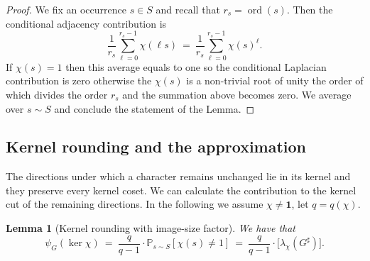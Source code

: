 \documentclass[11pt]{article}
\newtheorem{lemma}[theorem]{Lemma}
\theoremstyle{definition}
\theoremstyle{remark}
\newcommand{\Prb}{\mathbb{P}}
\newcommand{\ord}{\operatorname{ord}}
\begin{document}
\begin{proof}
We fix an occurrence $s \in S$ and recall that $r_s = \ord(s)$. Then the conditional adjacency contribution is 
\[
\frac{1}{r_s} \sum_{\ell=0}^{r_s-1} \chi(\ell s) 
~=~
\frac{1}{r_s} \sum_{\ell = 0}^{r_s-1} \chi(s)^\ell.
\]
If $\chi(s) = 1$ then this average equals to one so the conditional Laplacian contribution is  zero otherwise the $\chi(s)$ is a non-trivial root of unity the order of which divides the order $r_s$ and the summation above becomes zero.  We average over $s \sim S$ and conclude the statement of the Lemma.

\end{proof}




\subsection{Kernel rounding and the approximation}
The directions under which a character remains unchanged lie in its kernel and they preserve every kernel coset. We can calculate the contribution to the kernel cut of the remaining directions. In the following we assume $\chi\ne\mathbf{1}$, let $q=q(\chi)$.

\begin{lemma}[Kernel rounding with image-size factor]\label{lem:kernel-rounding}
We have that
\begin{equation}\label{eq:kernel-beta}
  \psi_G(\ker \chi)
  ~=~ \frac{q}{q-1} \cdot \Prb_{s\sim S}[\chi(s)\neq 1]
  ~=~ \frac{q}{q-1} \cdot \bigg[\lambda_\chi(G^\sharp)\bigg].
\end{equation}
\end{lemma}
\end{document}
